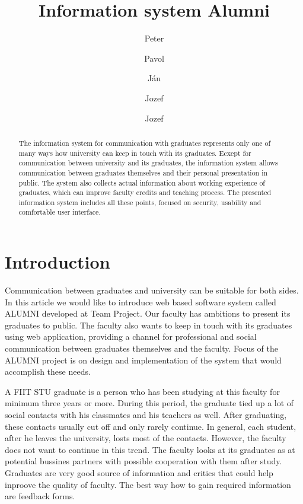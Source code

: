 \documentclass{iitsrc}[2006/14/02]
\title{Information system Alumni}
\author{Peter}{C\'ich}
\author{Pavol}{F\'abik}
\author{J\'an}{Garaj}
\author{Jozef}{Hergott}
\author{Jozef}{Hopko}
\begin{document}
\begin{abstract}
The information system for communication with graduates represents only one of many ways how university can keep in touch with its graduates. Ecxept for communication between university and its graduates, the information system allows communication between graduates themselves and their personal presentation in public. The system also collects actual information about working experience of graduates, which can improve faculty credits and teaching process. The presented information system includes all these points, focused on security, usability and comfortable user interface.
\end{abstract}


\section{Introduction}

Communication between graduates and university can be suitable for both sides. In this article we would like to introduce web based software system called ALUMNI developed at Team Project. Our faculty has ambitions to present its graduates to public. The faculty also wants to keep in touch with its graduates using web application, providing a channel for professional and social communication between graduates themselves and the faculty. Focus of the ALUMNI project is on design and implementation of the system that would accomplish these needs. 

A FIIT STU graduate is a person who has been studying at this faculty for minimum three years or more. During this period, the graduate tied up a lot of social contacts with his classmates and his teachers as well. After graduating, these contacts usually cut off and only rarely continue. In general, each student, after he leaves the university, losts most of the contacts. However, the faculty does not want to continue in this trend. The faculty looks at its graduates as at potential bussines partners with possible cooperation with them after study. Graduates are very good source of information and critics that could help inproove the quality of faculty. The best way how to gain required information are feedback forms.


\end{document}
